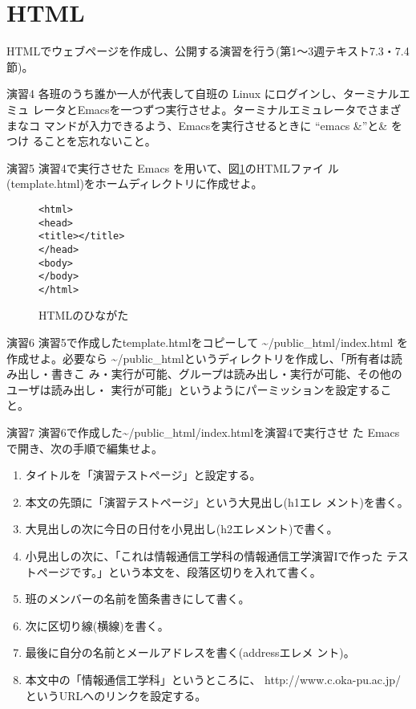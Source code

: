 \documentclass[a4j,10pt]{jarticle}
\begin{document}
\section{HTML}
HTMLでウェブページを作成し、公開する演習を行う(第1〜3週テキスト7.3・7.4
節)。

\begin{itembox}{演習4}
 各班のうち誰か一人が代表して自班の Linux にログインし、ターミナルエミュ
 レータとEmacsを一つずつ実行させよ。ターミナルエミュレータでさまざまなコ
 マンドが入力できるよう、Emacsを実行させるときに ``emacs \&''と\& をつけ
 ることを忘れないこと。
\end{itembox}
\begin{itembox}{演習5}
 演習4で実行させた Emacs を用いて、図\ref{fig:template.html}のHTMLファイ
 ル(template.html)をホームディレクトリに作成せよ。
\end{itembox}
\begin{figure}[htbp]
 \begin{verbatim}
<html>
<head>
<title></title>
</head>
<body>
</body>
</html>
 \end{verbatim}
 \caption{HTMLのひながた}
 \label{fig:template.html}
\end{figure}
\begin{itembox}{演習6}
 演習5で作成したtemplate.htmlをコピーして {\sffamily
 \~{}/public\_html/index.html} を作成せよ。必要なら {\sffamily
 \~{}/public\_html}というディレクトリを作成し、「所有者は読み出し・書きこ
 み・実行が可能、グループは読み出し・実行が可能、その他のユーザは読み出し・
 実行が可能」というようにパーミッションを設定すること。
\end{itembox}
\begin{itembox}{演習7}
 演習6で作成した{\sffamily \~{}/public\_html/index.html}を演習4で実行させ
 た Emacs で開き、次の手順で編集せよ。
 \begin{enumerate}
  \item タイトルを「演習テストページ」と設定する。
  \item 本文の先頭に「演習テストページ」という大見出し({\sffamily h1}エレ
	メント)を書く。
  \item 大見出しの次に今日の日付を小見出し({\sffamily h2}エレメント)で書く。
  \item 小見出しの次に、「これは情報通信工学科の情報通信工学演習Iで作った
	テストページです。」という本文を、段落区切りを入れて書く。
  \item 班のメンバーの名前を箇条書きにして書く。
  \item 次に区切り線(横線)を書く。
  \item 最後に自分の名前とメールアドレスを書く({\sffamily address}エレメ
	ント)。
  \item 本文中の「情報通信工学科」というところに、{\sffamily
	http://www.c.oka-pu.ac.jp/}というURLへのリンクを設定する。
 \end{enumerate}
\end{itembox}
\end{document}
